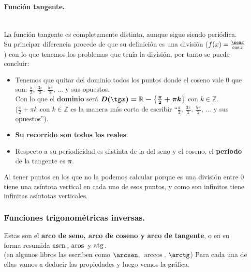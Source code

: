 \documentclass[a4paper,11pt,answers]{exam}
\begin{document}
\paragraph{Función tangente.}\mbox{}\\
La función tangente es completamente distinta, aunque sigue siendo periódica.\\
Su principar diferencia procede de que su definición es una división ($f(x) = \frac{\sen x}{\cos x}$)  con lo que tenemos los problemas que tenía la división, por tanto se puede concluir:
\begin{itemize}
	\item Tenemos que quitar del dominio todos los puntos donde el coseno vale 0 que son: $\frac{\pi}{2}$, $\frac{3\pi}{2}$. $\frac{5\pi}{2}$, ... y sus opuestos.\\
	Con lo que el \textbf{dominio} será $\boldsymbol{D(\tg x) = \mathbb{R} - \left\lbrace\frac{\pi}{2} + \pi k\right\rbrace}$ con $k \in \mathbb{Z}$.\\
	($\frac{\pi}{2} + \pi k$ con $k \in \mathbb{Z}$ es la manera más corta de escribir ``$\frac{\pi}{2}$, $\frac{3\pi}{2}$. $\frac{5\pi}{2}$, ... y sus opuestos'').
	\item \textbf{Su recorrido son todos los reales}.
	\item Respecto a su periodicidad es distinta de la del seno y el coseno, el \textbf{periodo} de la tangente es $\boldsymbol{\pi}$.
\end{itemize}
Al tener puntos en los que no la podemos calcular porque es una división entre 0 tiene una asíntota vertical en cada uno de esos puntos, y como son infinitos tiene infinitas asíntotas verticales.\\

\subsubsection{Funciones trigonométricas inversas.}
Estas son el \textbf{arco de seno, arco de coseno y arco de tangente}, o en su forma resumida $\mathrm{asen\,}$, $\mathrm{acos\,}$ y $\mathrm{atg\,}$.\\
(en algunos libros las escriben como $\arcsen$, $\arccos$, $\arctg$)
Para cada una de ellas vamos a deducir las propiedades y luego vemos la gráfica.\\
\end{document}

